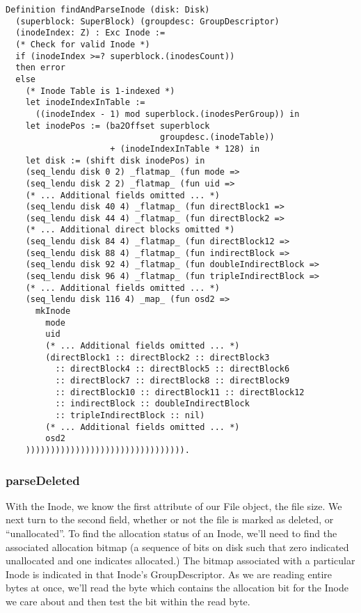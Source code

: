 \documentclass[nocopyrightspace]{sigplanconf}
\begin{document}
\begin{lstlisting}
Definition findAndParseInode (disk: Disk) 
  (superblock: SuperBlock) (groupdesc: GroupDescriptor)
  (inodeIndex: Z) : Exc Inode :=
  (* Check for valid Inode *)
  if (inodeIndex >=? superblock.(inodesCount))
  then error
  else
    (* Inode Table is 1-indexed *)
    let inodeIndexInTable := 
      ((inodeIndex - 1) mod superblock.(inodesPerGroup)) in
    let inodePos := (ba2Offset superblock
                               groupdesc.(inodeTable))
                     + (inodeIndexInTable * 128) in
    let disk := (shift disk inodePos) in
    (seq_lendu disk 0 2) _flatmap_ (fun mode =>
    (seq_lendu disk 2 2) _flatmap_ (fun uid =>
    (* ... Additional fields omitted ... *)
    (seq_lendu disk 40 4) _flatmap_ (fun directBlock1 =>
    (seq_lendu disk 44 4) _flatmap_ (fun directBlock2 =>
    (* ... Additional direct blocks omitted *)
    (seq_lendu disk 84 4) _flatmap_ (fun directBlock12 =>
    (seq_lendu disk 88 4) _flatmap_ (fun indirectBlock =>
    (seq_lendu disk 92 4) _flatmap_ (fun doubleIndirectBlock =>
    (seq_lendu disk 96 4) _flatmap_ (fun tripleIndirectBlock =>
    (* ... Additional fields omitted ... *)
    (seq_lendu disk 116 4) _map_ (fun osd2 =>
      mkInode
        mode
        uid
        (* ... Additional fields omitted ... *)
        (directBlock1 :: directBlock2 :: directBlock3
          :: directBlock4 :: directBlock5 :: directBlock6
          :: directBlock7 :: directBlock8 :: directBlock9
          :: directBlock10 :: directBlock11 :: directBlock12
          :: indirectBlock :: doubleIndirectBlock
          :: tripleIndirectBlock :: nil)
        (* ... Additional fields omitted ... *)
        osd2
    )))))))))))))))))))))))))))))))).
\end{lstlisting}


\subsubsection{parseDeleted}
With the Inode, we know the first attribute of our File object, the file size.
We next turn to the second field, whether or not the file is marked as
deleted, or ``unallocated''. To find the allocation status of an Inode, we'll
need to find the associated allocation bitmap (a sequence of bits on disk such
that zero indicated unallocated and one indicates allocated.) The bitmap
associated with a particular Inode is indicated in that Inode's
GroupDescriptor. As we are reading entire bytes at once, we'll read the byte
which contains the allocation bit for the Inode we care about and then test
the bit within the read byte.
\end{document}
